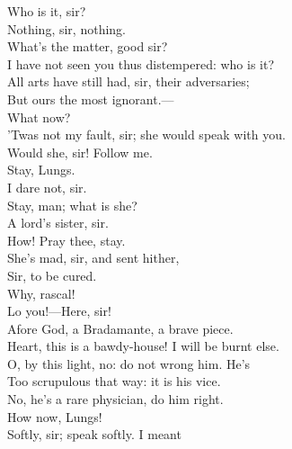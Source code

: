 \documentclass[a4paper,oneside,12pt]{memoir}
\begin{document}
\begin{drama*}
\mammonspeaks {} Who is it, sir?\\
\subtlespeaks Nothing, sir, nothing.\\
\mammonspeaks {} What's the matter, good sir?\\
I have not seen you thus distempered: who is it?\\
\subtlespeaks All arts have still had, sir, their adversaries;\\
But ours the most ignorant.---\\
 What now?\\
\facespeaks 'Twas not my fault, sir; she would speak with you.\\
\subtlespeaks Would she, sir! Follow me.\\
\mammonspeaks {} Stay, Lungs.\\
\facespeaks {} I dare not, sir.\\
\mammonspeaks Stay, man; what is she?\\
\facespeaks {} A lord's sister, sir.\\
\mammonspeaks How! Pray thee, stay.\\
\facespeaks {} She's mad, sir, and sent hither,\\
\facespeaks Sir, to be cured.\\
\subtlespeaks {}  Why, rascal!\\
\facespeaks {} Lo you!---Here, sir!\\
\mammonspeaks Afore God, a Bradamante, a brave piece.\\
\surlyspeaks Heart, this is a bawdy-house! I will be burnt else.\\
\mammonspeaks O, by this light, no: do not wrong him. He's\\
Too scrupulous that way: it is his vice.\\
No, he's a rare physician, do him right.\\
How now, Lungs!\\
\facespeaks {} Softly, sir; speak softly. I meant\\

\end{drama*}
\end{document}
